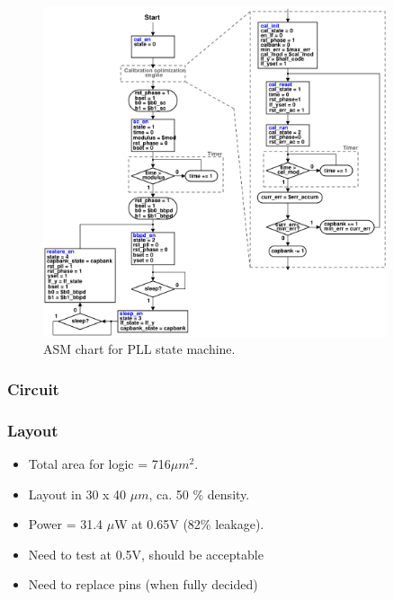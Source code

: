 			\begin{figure}[htb!]
			        \centering
			        \includegraphics[width=0.9\textwidth, angle=0]{./figs/pll_asm}
			    \caption{ASM chart for PLL state machine.}
			    \label{fig:asm}
			\end{figure}


		\subsubsection{Circuit}
		\subsubsection{Layout}

			\begin{itemize}[itemsep=4pt,label=\protect---]
			        \item Total area for logic = 716$\mu m^2$.
			        \item Layout in 30 x 40 $\mu m$, ca. 50 \% density.
			        \item Power = 31.4 $\mu$W at 0.65V (82\% leakage).
			        \item Need to test at 0.5V, should be acceptable
			        \item Need to replace pins (when fully decided)
			\end{itemize}

